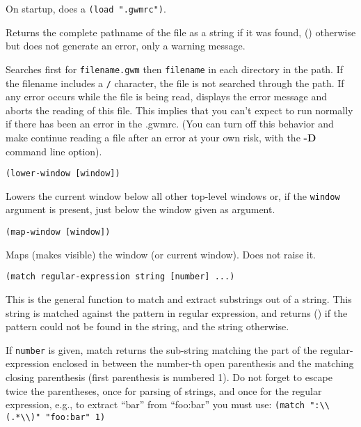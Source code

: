 On startup, {\GWM} does a \verb|(load ".gwmrc")|.

Returns the complete pathname of the file as a string if it was found, ()
otherwise but does not generate an error, only a warning message.

Searches first for \verb"filename.gwm" then \verb"filename" in each
directory in the path. If the filename includes a \verb"/" character, the
file is not searched through the path. If any error occurs while the file is
being read, {\WOOL} displays the error message and aborts the reading of
this file. This implies that you can't expect {\GWM} to run normally if
there has been an error in the .gwmrc. (You can turn off this behavior and
make {\GWM} continue reading a file after an error at your own risk, with
the {\bf -D} command line option).

        
{\usagefont\begin{verbatim}
(lower-window [window])
\end{verbatim}}\usageupspace

Lowers  the current window below all other top-level windows or, if the
\verb"window" argument is present, just below the window given as argument.


        
{\usagefont\begin{verbatim}
(map-window [window])
\end{verbatim}}\usageupspace

Maps (makes visible) the window (or current window). Does not raise it.

        
{\usagefont\begin{verbatim}
(match regular-expression string [number] ...)
\end{verbatim}}\usageupspace

This is the general function to match and extract substrings out of a {\WOOL}
string. This string is matched against the pattern in regular expression,
and returns () if the pattern could not be found in the string, and the
string otherwise.

If \verb"number" is given, match returns the sub-string 
matching the part of the
regular-expression enclosed in between the number-th open parenthesis and
the matching closing  parenthesis (first parenthesis is numbered 1). Do not
forget to escape twice the parentheses, once for {\GWM} parsing of strings, and
once for the regular expression, e.g., to extract ``bar'' from ``foo:bar'' you
must use: \verb|(match ":\\(.*\\)" "foo:bar" 1)|

